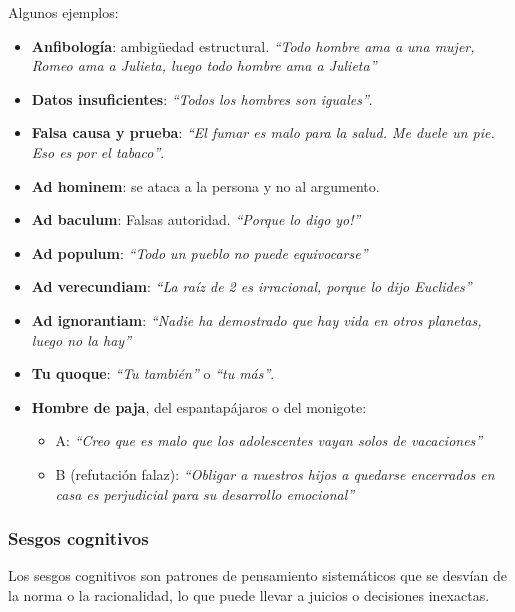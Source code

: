 Algunos ejemplos:
\begin{itemize}
	\item \textbf{Anfibología}: ambigüedad estructural. \textit{``Todo hombre ama a una mujer, Romeo ama a Julieta, luego todo hombre ama a Julieta''}
	\item \textbf{Datos insuficientes}: \textit{``Todos los hombres son iguales''}.
	\item \textbf{Falsa causa y prueba}: \textit{``El fumar es malo para la salud. Me duele un pie. Eso es por el tabaco''}.
	\item \textbf{Ad hominem}: se ataca a la persona y no al argumento.
	\item \textbf{Ad baculum}: Falsas autoridad. \textit{``Porque lo digo yo!''}
	\item \textbf{Ad populum}: \textit{``Todo un pueblo no puede equivocarse''}
	\item \textbf{Ad verecundiam}: \textit{``La raíz de 2 es irracional, porque lo dijo Euclides''}
	\item \textbf{Ad ignorantiam}: \textit{``Nadie ha demostrado que hay vida en otros planetas, luego no la hay''}
	\item \textbf{Tu quoque}: \textit{``Tu también''} o \textit{``tu más''}.
	\item \textbf{Hombre de paja}, del espantapájaros o del monigote:
	\begin{itemize}
		\item A: \textit{``Creo que es malo que los adolescentes vayan solos de vacaciones''}
		\item B (refutación falaz): \textit{``Obligar a nuestros hijos a quedarse encerrados en casa es perjudicial para su desarrollo emocional''}
	\end{itemize}
\end{itemize}

\subsubsection{Sesgos cognitivos}

Los sesgos cognitivos son patrones de pensamiento sistemáticos que se desvían de la norma o la racionalidad, lo que puede llevar a juicios o decisiones inexactas.


